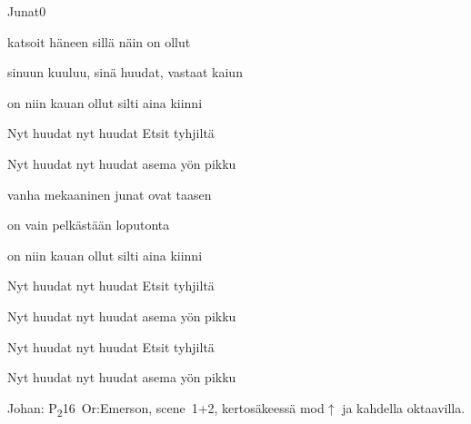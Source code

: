 \documentclass[12pt,a4paper]{article}
\begin{document}
\thispagestyle{empty}
\begin{mysong}{Junat}{0}


\begin{SBVerse}
   katsoit häneen sillä   näin on
  ollut 

   sinuun kuuluu, sinä   huudat, vastaat
  kaiun 

   on niin kauan ollut   silti aina
  kiinni 
\end{SBVerse}

\begin{SBChorus}
  Nyt huudat  nyt huudat  Etsit
   tyhjiltä 

  Nyt huudat  nyt huudat 
  asema yön pikku
\end{SBChorus}


\begin{SBVerse}
   vanha mekaaninen   junat ovat
  taasen 

   on vain pelkästään   loputonta

   on niin kauan ollut   silti aina
  kiinni 
\end{SBVerse}

\begin{SBChorus}
  Nyt huudat  nyt huudat  Etsit
   tyhjiltä 

  Nyt huudat  nyt huudat 
  asema yön pikku
\end{SBChorus}


\begin{SBChorus}
  Nyt huudat  nyt huudat  Etsit
   tyhjiltä 

  Nyt huudat  nyt huudat 
  asema yön pikku
\end{SBChorus}

{\SBLyricNoteFont Johan: P\textsubscript{2}16~Or:Emerson, scene~1+2,
kertosäkeessä mod$\uparrow$ ja kahdella oktaavilla.}

\end{mysong}
\end{document}
